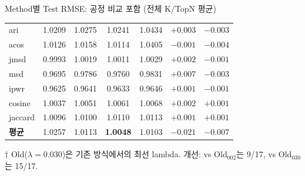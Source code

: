 \documentclass[aspectratio=169,10pt]{beamer}
\begin{document}
\begin{frame}[shrink=55]{Method별 Test RMSE: 공정 비교 포함 (전체 K/TopN 평균)}
\begin{center}
\begin{tabular}{l|cc|c|c|cc}
		ari            & 1.0209 & 1.0275 & 1.0241 & 1.0434 & \textcolor{negred}{$+0.003$} & \textcolor{testgreen}{$-0.003$} \\
		acos           & 1.0126 & 1.0158 & 1.0114 & 1.0405 & \textcolor{testgreen}{$-0.001$} & \textcolor{testgreen}{$-0.004$} \\
		jmsd           & 0.9993 & 1.0019 & 1.0011 & 1.0029 & \textcolor{negred}{$+0.002$} & \textcolor{testgreen}{$-0.001$} \\
		msd            & \textcolor{testgreen}{0.9695} & 0.9786 & 0.9760 & 0.9831 & \textcolor{negred}{$+0.007$} & \textcolor{testgreen}{$-0.003$} \\
		ipwr           & \textcolor{testgreen}{0.9625} & 0.9641 & 0.9633 & 0.9646 & \textcolor{negred}{$+0.001$} & \textcolor{testgreen}{$-0.001$} \\
		cosine         & 1.0037 & 1.0051 & 1.0061 & 1.0068 & \textcolor{negred}{$+0.002$} & \textcolor{negred}{$+0.001$} \\
		jaccard        & 1.0096 & 1.0100 & 1.0110 & 1.0113 & \textcolor{negred}{$+0.001$} & \textcolor{negred}{$+0.001$} \\
		\midrule
		\textbf{평균}  & 1.0257 & 1.0113 & \textbf{1.0048} & 1.0103
		  & \textcolor{testgreen}{$\mathbf{-0.021}$} & \textcolor{testgreen}{$\mathbf{-0.007}$} \\
		\bottomrule
	\end{tabular}
	\end{center}
	{\scriptsize $\dagger$ Old($\lambda{=}0.030$)은 기존 방식에서의 최선 lambda. 개선: vs Old$_{002}$는 9/17, vs Old$_{030}$는 15/17.}
\end{frame}
\end{document}
